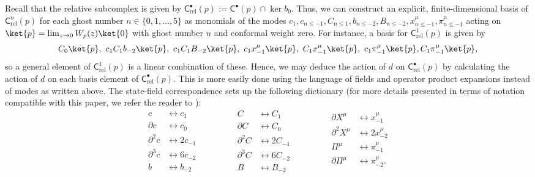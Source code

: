 \documentclass[11pt,reqno,a4paper,final]{amsart}
\theoremstyle{plain}
\theoremstyle{definition}
\renewcommand{\d}{\partial}
\newcommand{\sC}{\mathsf{C}}
\newcommand{\Crel}{\mathsf{C}_{\mathrm{rel}}} %
\newcommand{\1}{\mathbb{1}}
\numberwithin{equation}{section}
\begin{document}
Recall that the relative subcomplex is given by $\Crel^\bullet(p) :=
\sC^\bullet(p) \cap \ker b_0$. Thus, we can construct an explicit,
finite-dimensional basis of $\Crel^n(p)$ for each ghost number $n \in
\{0,1,\dots, 5\}$ as monomials of the modes $c_1, c_{n \leq -1}, C_{n
  \leq 1}, b_{n \leq -2}, B_{n \leq -2}, x^\mu_{n \leq -1}, \pi^\mu_{n
  \leq -1}$ acting on $\ket{p} = \lim_{z\to 0} W_p(z) \ket{0}$ with
ghost number $n$ and conformal weight zero. For instance, a basis for
$\Crel^1(p)$ is given by
\begin{equation} \label{eq:basis for C1rel in modes}
  C_0\ket{p},\ c_1 C_1 b_{-2}\ket{p},\ c_1 C_1 B_{-2}\ket{p},\ c_1 x^\mu_{-1}\ket{p} ,\ C_1  x^\mu_{-1}\ket{p},\ c_1 \pi^\mu_{-1}\ket{p}, C_1\pi^\mu_{-1}\ket{p},
\end{equation}
so a general element of $\Crel^1(p)$ is a linear combination of these.
Hence, we may deduce the action of $d$ on $\Crel^\bullet(p)$ by
calculating the action of $d$ on each basis element of
$\Crel^\bullet(p)$. This is more easily done using the language of
fields and operator product expansions instead of modes as written
above. The state-field correspondence sets up the following dictionary
(for more details presented in terms of notation compatible with this
paper, we refer the reader to \cite[Appendix
A.1]{Figueroa-OFarrill:2024wgs}):
\begin{equation}
  \label{eq:state-field-corr}
  \begin{aligned}
    c &\leftrightarrow c_1\\
    \d c &\leftrightarrow c_0\\
    \d^2 c &\leftrightarrow 2 c_{-1}\\
    \d^3 c &\leftrightarrow 6 c_{-2}\\
    b &\leftrightarrow b_{-2}
  \end{aligned}
  \qquad\qquad
  \begin{aligned}
    C &\leftrightarrow C_1\\
    \d C &\leftrightarrow C_0\\
    \d^2 C &\leftrightarrow 2 C_{-1}\\
    \d^3 C &\leftrightarrow 6 C_{-2}\\
    B &\leftrightarrow B_{-2}
  \end{aligned}
  \qquad\qquad
  \begin{aligned}
    \d X^\mu &\leftrightarrow x^\mu_{-1}\\
    \d^2 X^\mu &\leftrightarrow 2 x^\mu_{-2}\\
    \Pi^\mu &\leftrightarrow \pi^\mu_{-1}\\
    \d \Pi^\mu &\leftrightarrow \pi^\mu_{-2}.\\
  \end{aligned}
\end{equation}
\end{document}

